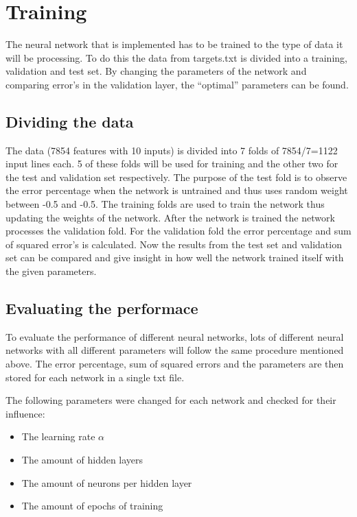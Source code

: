 \section{Training} \label {chapter:training}

The neural network that is implemented has to be trained to the type of data it will be processing. To do this the data from targets.txt is divided into a training, validation and test set. By changing the parameters of the network and comparing error's in the validation layer, the \enquote{optimal} parameters can be found.

\subsection{Dividing the data}
The data (7854 features with 10 inputs) is divided into 7 folds of 7854/7=1122 input lines each. 5 of these folds will be used for training and the other two for the test and validation set respectively. The purpose of the test fold is to observe the error percentage when the network is untrained  and thus uses random weight between -0.5 and -0.5. The training folds are used to train the network thus updating the weights of the network. After the network is trained the network processes the validation fold. For the validation fold the error percentage and sum of squared error's is calculated. Now the results from the test set and validation set can be compared and give insight in how well the network trained itself with the given parameters. 

\subsection{Evaluating the performace}
To evaluate the performance of different neural networks, lots of different neural networks with all different parameters will follow the same procedure mentioned above. The error percentage, sum of squared errors and the parameters are then stored for each network in a single txt file. 

The following parameters were changed for each network and checked for their influence:
\begin{itemize}
\item The learning rate $\alpha$
\item The amount of hidden layers
\item The amount of neurons per hidden layer
\item The amount of epochs of training
\end{itemize}

